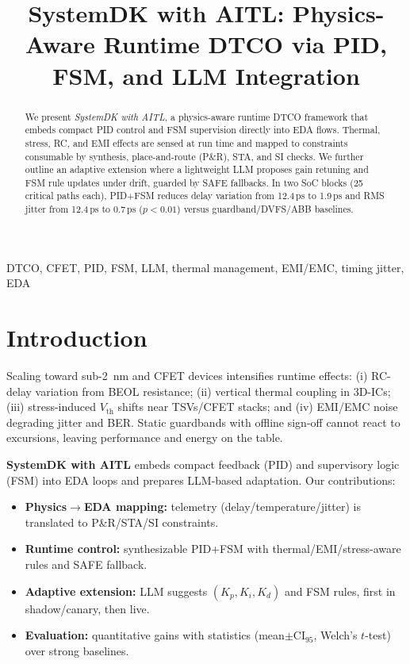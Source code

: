 \documentclass[conference]{IEEEtran}
\title{SystemDK with AITL: Physics-Aware Runtime DTCO via PID, FSM, and LLM Integration}
\author{%
  \IEEEauthorblockN{Shinichi Samizo}%
  \IEEEauthorblockA{Independent Semiconductor Researcher\\
  Email: \href{mailto:shin3t72@gmail.com}{shin3t72@gmail.com}}%
}
\newcommand{\CI}{\mathrm{CI}_{95}}
\begin{document}
\maketitle

\begin{abstract}
We present \emph{SystemDK with AITL}, a physics-aware runtime DTCO framework that embeds compact PID control and FSM supervision directly into EDA flows. Thermal, stress, RC, and EMI effects are sensed at run time and mapped to constraints consumable by synthesis, place-and-route (P\&R), STA, and SI checks. We further outline an adaptive extension where a lightweight LLM proposes gain retuning and FSM rule updates under drift, guarded by SAFE fallbacks. In two SoC blocks (25 critical paths each), PID+FSM reduces delay variation from 12.4\,ps to 1.9\,ps and RMS jitter from 12.4\,ps to 0.7\,ps ($p<0.01$) versus guardband/DVFS/ABB baselines.
\end{abstract}

\begin{IEEEkeywords}
DTCO, CFET, PID, FSM, LLM, thermal management, EMI/EMC, timing jitter, EDA
\end{IEEEkeywords}

\section{Introduction}
Scaling toward sub-\SI{2}{\nano\meter} and CFET devices intensifies runtime effects: (i) RC-delay variation from BEOL resistance; (ii) vertical thermal coupling in 3D-ICs; (iii) stress-induced $V_\mathrm{th}$ shifts near TSVs/CFET stacks; and (iv) EMI/EMC noise degrading jitter and BER. Static guardbands with offline sign-off cannot react to excursions, leaving performance and energy on the table.

\textbf{SystemDK with AITL} embeds compact feedback (PID) and supervisory logic (FSM) into EDA loops and prepares LLM-based adaptation. Our contributions:
\begin{itemize}
  \item \textbf{Physics$\to$EDA mapping:} telemetry (delay/temperature/jitter) is translated to P\&R/STA/SI constraints.
  \item \textbf{Runtime control:} synthesizable PID+FSM with thermal/EMI/stress-aware rules and SAFE fallback.
  \item \textbf{Adaptive extension:} LLM suggests $(K_p,K_i,K_d)$ and FSM rules, first in shadow/canary, then live.
  \item \textbf{Evaluation:} quantitative gains with statistics (mean$\pm\CI$, Welch's $t$-test) over strong baselines.
\end{itemize}
\end{document}
